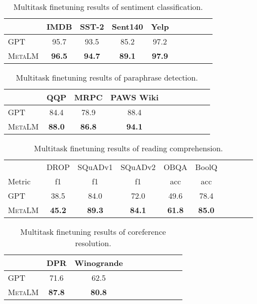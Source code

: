 \documentclass{article}
\theoremstyle{plain}
\theoremstyle{definition}
\theoremstyle{remark}
\newcommand\ours{\textsc{MetaLM}}
\begin{document}
\begin{table}[tp!]
\centering
\begin{tabular}{l c c c c c c c c c}
\toprule
 & IMDB & SST-2 & Sent140 & Yelp \\
\midrule
GPT & 95.7 & 93.5 & 85.2 & 97.2 \\
\ours{} & \textbf{96.5}& \textbf{94.7}& \textbf{89.1}& \textbf{97.9} \\
\bottomrule
\end{tabular}
\caption{Multitask finetuning results of sentiment classification.}
\label{tbl:multi:sent}
\end{table}

\begin{table}[tp!]
\centering
\begin{tabular}{l c c c c c c c c c}
\toprule
 & QQP & MRPC & PAWS Wiki \\
\midrule
GPT & 84.4 & 78.9 & 88.4 \\
\ours{} & \textbf{88.0}& \textbf{86.8}& \textbf{94.1} \\
\bottomrule
\end{tabular}
\caption{Multitask finetuning results of paraphrase detection.}
\label{tbl:multi:para}
\end{table}

\begin{table}[tp!]
\centering
\begin{tabular}{l c c c c c c c c c}
\toprule
 & DROP & SQuADv1 & SQuADv2 & OBQA & BoolQ \\
 Metric & f1 & f1 & f1 & acc & acc \\
\midrule
GPT & 38.5 & 84.0 & 72.0 & 49.6 & 78.4 \\
\ours{} & \textbf{45.2}& \textbf{89.3}& \textbf{84.1}& \textbf{61.8}& \textbf{85.0} \\
\bottomrule
\end{tabular}
\caption{Multitask finetuning results of reading comprehension.}
\label{tbl:multi:reading}
\end{table}

\begin{table}[tp!]
\centering
\begin{tabular}{l c c c c c c c c c}
\toprule
 & DPR & Winogrande \\
\midrule
GPT & 71.6 & 62.5 \\
\ours{} & \textbf{87.8}& \textbf{80.8} \\
\bottomrule
\end{tabular}
\caption{Multitask finetuning results of coreference resolution.}
\label{tbl:multi:coref}
\end{table}
\end{document}
